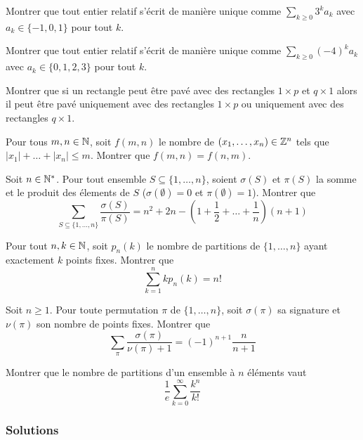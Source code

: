 \begin{exo}
Montrer que tout entier relatif s'écrit de manière unique comme $\sum_{k\ge 0}3^ka_k$ avec $a_k\in\{-1,0,1\}$ pour tout $k$.
\end{exo}


\begin{exo}
Montrer que tout entier relatif s'écrit de manière unique comme $\sum_{k\ge 0}(-4)^ka_k$ avec $a_k\in\{0,1,2,3\}$ pour tout $k$.
\end{exo}


\begin{exo}
Montrer que si un rectangle peut être pavé avec des rectangles $1\times p$ et $q\times 1$ alors il peut être pavé uniquement avec des rectangles $1\times p$ ou uniquement avec des rectangles $q\times 1$.
\end{exo}


\begin{exo}
Pour tous $m,n\in\mathbb N$, soit $f(m,n)$ le nombre de $(x_1, \dots, x_n)\in\mathbb Z^n$ tels que $|x_1|+\dots+|x_n|\le m$. Montrer que $f(m,n)=f(n,m)$.
\end{exo}


\begin{exo}
Soit $n\in\mathbb N^*$. Pour tout ensemble $S\subseteq \{1, \dots, n\}$, soient $\sigma(S)$ et $\pi(S)$ la somme et le produit des élements de $S$ ($\sigma(\emptyset) = 0$ et $\pi(\emptyset) = 1$). Montrer que
$$\sum_{S\subseteq \{1, \dots, n\}} \frac{\sigma(S)}{\pi(S)} = n^2 + 2n - \left(1 + \frac{1}{2} + \dots + \frac{1}{n}\right)(n+1)$$
\end{exo}


\begin{exo}
Pour tout $n,k\in\mathbb N$, soit $p_n(k)$ le nombre de partitions de $\{1, \dots, n\}$ ayant exactement $k$ points fixes. Montrer que
$$\sum_{k=1}^n kp_n(k)=n!$$
\end{exo}


\begin{exo}
Soit $n\ge 1$. Pour toute permutation $\pi$ de $\{1,\dots,n\}$, soit $\sigma(\pi)$ sa signature et $\nu(\pi)$ son nombre de points fixes. Montrer que
$$\sum_{\pi}\frac{\sigma(\pi)}{\nu(\pi)+1}=(-1)^{n+1}\frac{n}{n+1}$$
\end{exo}


\begin{exo}
Montrer que le nombre de partitions d'un ensemble à $n$ éléments vaut
$$\frac 1e \sum_{k=0}^\infty \frac{k^n}{k!}$$
\end{exo}


\subsubsection{Solutions}


